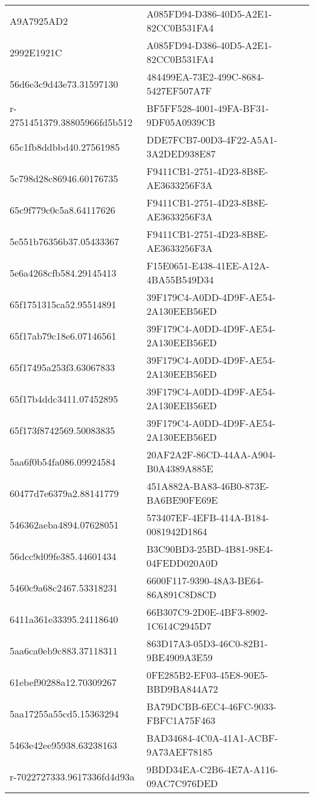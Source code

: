 \begin{tabular}{ll}
A9A7925AD2 & A085FD94-D386-40D5-A2E1-82CC0B531FA4 \\
2992E1921C & A085FD94-D386-40D5-A2E1-82CC0B531FA4 \\
56d6e3c9d43e73.31597130 & 484499EA-73E2-499C-8684-5427EF507A7F \\
r-2751451379.38805966fd5b512 & BF5FF528-4001-49FA-BF31-9DF05A0939CB \\
65c1fb8ddbbd40.27561985 & DDE7FCB7-00D3-4F22-A5A1-3A2DED938E87 \\
5c798d28c86946.60176735 & F9411CB1-2751-4D23-8B8E-AE3633256F3A \\
65c9f779c0c5a8.64117626 & F9411CB1-2751-4D23-8B8E-AE3633256F3A \\
5e551b76356b37.05433367 & F9411CB1-2751-4D23-8B8E-AE3633256F3A \\
5e6a4268cfb584.29145413 & F15E0651-E438-41EE-A12A-4BA55B549D34 \\
65f1751315ca52.95514891 & 39F179C4-A0DD-4D9F-AE54-2A130EEB56ED \\
65f17ab79c18e6.07146561 & 39F179C4-A0DD-4D9F-AE54-2A130EEB56ED \\
65f17495a253f3.63067833 & 39F179C4-A0DD-4D9F-AE54-2A130EEB56ED \\
65f17b4ddc3411.07452895 & 39F179C4-A0DD-4D9F-AE54-2A130EEB56ED \\
65f173f8742569.50083835 & 39F179C4-A0DD-4D9F-AE54-2A130EEB56ED \\
5aa6f0b54fa086.09924584 & 20AF2A2F-86CD-44AA-A904-B0A4389A885E \\
60477d7e6379a2.88141779 & 451A882A-BA83-46B0-873E-BA6BE90FE69E \\
546362aeba4894.07628051 & 573407EF-4EFB-414A-B184-0081942D1864 \\
56dcc9d09fe385.44601434 & B3C90BD3-25BD-4B81-98E4-04FEDD020A0D \\
5460c9a68c2467.53318231 & 6600F117-9390-48A3-BE64-86A891C8D8CD \\
6411a361e33395.24118640 & 66B307C9-2D0E-4BF3-8902-1C614C2945D7 \\
5aa6ca0eb9c883.37118311 & 863D17A3-05D3-46C0-82B1-9BE4909A3E59 \\
61ebef90288a12.70309267 & 0FE285B2-EF03-45E8-90E5-BBD9BA844A72 \\
5aa17255a55cd5.15363294 & BA79DCBB-6EC4-46FC-9033-FBFC1A75F463 \\
5463e42ee95938.63238163 & BAD34684-4C0A-41A1-ACBF-9A73AEF78185 \\
r-7022727333.9617336fd4d93a & 9BDD34EA-C2B6-4E7A-A116-09AC7C976DED \\

\end{tabular}

